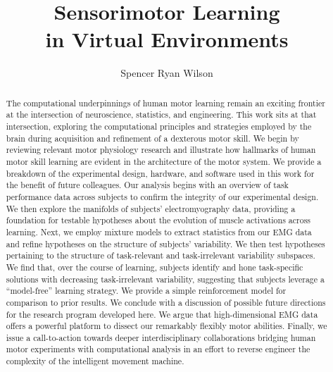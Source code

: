 \title{Sensorimotor Learning\\in Virtual Environments}
\author{Spencer Ryan Wilson}

\maketitle

\makedeclaration

\begin{abstract} %

The computational underpinnings of human motor learning remain an exciting frontier at the intersection of neuroscience, statistics, and engineering. This work sits at that intersection, exploring the computational principles and strategies employed by the brain during acquisition and refinement of a dexterous motor skill. We begin by reviewing relevant motor physiology research and illustrate how hallmarks of human motor skill learning are evident in the architecture of the motor system. We provide a breakdown of the experimental design, hardware, and software used in this work for the benefit of future colleagues. Our analysis begins with an overview of task performance data across subjects to confirm the integrity of our experimental design. We then explore the manifolds of subjects' electromyography data, providing a foundation for testable hypotheses about the evolution of muscle activations across learning. Next, we employ mixture models to extract statistics from our EMG data and refine hypotheses on the structure of subjects' variability. We then test hypotheses pertaining to the structure of task-relevant and task-irrelevant variability subspaces. We find that, over the course of learning, subjects identify and hone task-specific solutions with decreasing task-irrelevant variability, suggesting that subjects leverage a ``model-free'' learning strategy. We provide a simple reinforcement model for comparison to prior results. We conclude with a discussion of possible future directions for the research program developed here. We argue that high-dimensional EMG data offers a powerful platform to dissect our remarkably flexibly motor abilities. Finally, we issue a call-to-action towards deeper interdisciplinary collaborations bridging human motor experiments with computational analysis in an effort to reverse engineer the complexity of the intelligent movement machine.

\end{abstract}

